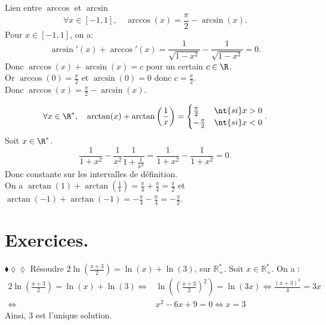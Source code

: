 \documentclass[11pt]{article}
\begin{document}
\begin{prop}{Lien entre $\arccos$ et $\arcsin$}{}
    \begin{equation*}
        \forall x \in [-1,1],\quad\arccos(x)=\frac{\pi}{2}-\arcsin(x).
    \end{equation*}
    \tcblower
    Pour $x\in[-1,1]$, on a:
    \begin{equation*}
        \arcsin'(x)+\arccos'(x)=\frac{1}{\sqrt{1-x^2}}-\frac{1}{\sqrt{1-x^2}}=0.
    \end{equation*}
    Donc $\arccos(x)+\arcsin(x)=c$ pour un certain $c\in\R$.\\
    Or $\arccos(0)=\frac{\pi}{2}$ et $\arcsin(0)=0$ donc $c=\frac{\pi}{2}$.\\
    Donc $\arccos(x)=\frac{\pi}{2}-\arcsin(x)$.
\end{prop}

\begin{prop}{}{}
    \begin{equation*}
        \forall x \in \R^*,\quad\arctan(x)+\arctan\left( \frac{1}{x} \right)=\begin{cases}\frac{\pi}{2}&\nt{si }x>0\\-\frac{\pi}{2}&\nt{si }x<0\end{cases}.
    \end{equation*}
    \tcblower
    Soit $x\in\R^*$.
    \begin{equation*}
        \frac{1}{1+x^2}-\frac{1}{x^2}\frac{1}{1+\frac{1}{x^2}}=\frac{1}{1+x^2}-\frac{1}{1+x^2}=0.
    \end{equation*}
    Donc constante sur les intervalles de définition.\\
    On a $\arctan(1)+\arctan(\frac{1}{1})=\frac{\pi}{4}+\frac{\pi}{4}=\frac{\pi}{2}$ et $\arctan(-1)+\arctan(-1)=-\frac{\pi}{4}-\frac{\pi}{4}=-\frac{\pi}{2}$.
\end{prop}

\pagebreak

\section{Exercices.}

\begin{exercice}{$\blacklozenge\lozenge\lozenge$}{}
    Résoudre $2\ln\left(\frac{x+3}{2}\right)=\ln(x)+\ln(3)$, sur $\mathbb{R}^*_+$.
    \tcblower
    Soit $x\in\mathbb{R^*_+}$. On a :
    \begin{align*}
        2\ln\left(\frac{x+3}{2}\right)=\ln(x)+\ln(3)
        \iff&\ln\left(\left(\frac{x+3}{2}\right)^2\right)=\ln(3x)
        \iff\frac{(x+3)^2}{4}=3x\\
        \iff&x^2-6x+9=0
        \iff x=3
    \end{align*}
    Ainsi, $3$ est l'unique solution.
\end{exercice}
\end{document}
